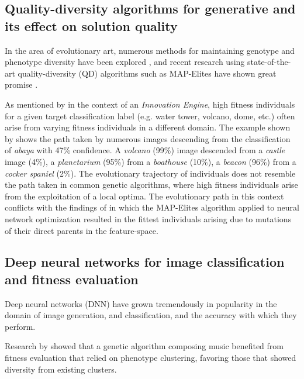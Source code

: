 \documentclass{article}
\begin{document}
	
	
	\subsection{Quality-diversity algorithms for generative  and its effect on solution quality}
	
	In the area of evolutionary art, numerous methods for maintaining genotype and phenotype diversity have been explored \cite{distributed-evolutionary-art, den2012maintaining}, and recent research using state-of-the-art quality-diversity (QD) algorithms such as MAP-Elites have shown great promise \citep{nguyen2015innovation}.
	
	As mentioned by \citet{nguyen2015innovation} in the context of an \textit{Innovation Engine}, high fitness individuals for a given target classification label (e.g. water tower, volcano, dome, etc.) often arise from varying fitness individuals in a different domain.
	The example shown by \citet{nguyen2015innovation} shows the path taken by numerous images descending from the classification of \textit{abaya} with 47\% confidence.
	A \textit{volcano} (99\%)  image descended from a \textit{castle} image (4\%), a \textit{planetarium} (95\%) from a \textit{boathouse} (10\%), a \textit{beacon} (96\%) from a \textit{cocker spaniel} (2\%).
	The evolutionary trajectory of individuals does not resemble the path taken in common genetic algorithms, where high fitness individuals arise from the exploitation of a local optima.
	The evolutionary path in this context conflicts with the findings of \citet{mouret2015illuminating} in which the MAP-Elites algorithm applied to neural network optimization resulted in the fittest individuals arising due to mutations of their direct parents in the feature-space.
	
	
	
	\subsection{Deep neural networks for image classification and fitness evaluation}
	Deep neural networks (DNN) have grown tremendously in popularity in the domain of image generation, and classification, and the accuracy with which they perform.
	
	Research by \citet{burton1998genetic} showed that a genetic algorithm composing music benefited from fitness evaluation that relied on phenotype clustering, favoring those that showed diversity from existing clusters.
	
\end{document}
